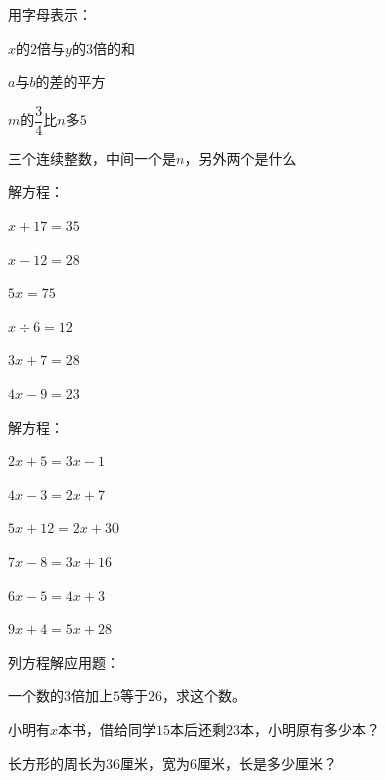 \documentclass[a4paper,12pt]{ctexart}
\begin{document}

\begin{exercise}
\item 用字母表示：
  \begin{subexercise}
    \item $x$的$2$倍与$y$的$3$倍的和
    \item $a$与$b$的差的平方
    \item $m$的$\dfrac{3}{4}$比$n$多$5$
    \item 三个连续整数，中间一个是$n$，另外两个是什么
  \end{subexercise}

\item 解方程：
  \begin{subexercise}
    \item $x+17=35$
    \item $x-12=28$
    \item $5x=75$
    \item $x\div6=12$
    \item $3x+7=28$
    \item $4x-9=23$
  \end{subexercise}

\item 解方程：
  \begin{subexercise}
    \item $2x+5=3x-1$
    \item $4x-3=2x+7$
    \item $5x+12=2x+30$
    \item $7x-8=3x+16$
    \item $6x-5=4x+3$
    \item $9x+4=5x+28$
  \end{subexercise}

\item 列方程解应用题：
  \begin{subexercise}
    \item 一个数的$3$倍加上$5$等于$26$，求这个数。
    \item 小明有$x$本书，借给同学$15$本后还剩$23$本，小明原有多少本？
    \item 长方形的周长为$36$厘米，宽为$6$厘米，长是多少厘米？
  \end{subexercise}
\end{exercise}

\newpage


\end{document}
